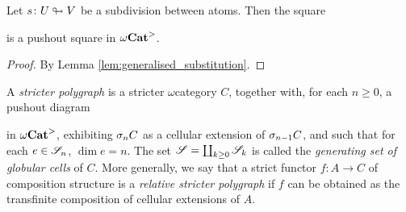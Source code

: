 \begin{cor} \label{cor:pushout_principal_cell}
    Let \( s \colon U \looparrowright V \) be a subdivision between atoms.
    Then the square
    \begin{center}
    \end{center}
    is a pushout square in \( {\omega\mathbf{Cat}}^> \).
\end{cor}
\begin{proof}
    By Lemma \ref{lem:generalised_substitution}.
\end{proof}

\begin{dfn}  \label{dfn:stricter_polygraph}
    A \emph{stricter polygraph} is a stricter \( \omega \)\nbd category \( C \), together with, for each \( n \geq 0 \), a pushout diagram
    \begin{center}
    \end{center}
    in \( {\omega\mathbf{Cat}}^> \), exhibiting \( \sigma_{n}C \) as a cellular extension of \( \sigma_{n - 1}C \), and such that for each \( e \in \mathscr{S}_n \), \( \dim e = n \).
    The set \( \mathscr{S} = \coprod_{k \geq 0} \mathscr{S}_k \) is called the \emph{generating set of globular cells} of \( C \).
    More generally, we say that a strict functor \( f \colon A \to C \) of composition structure is a \emph{relative stricter polygraph} if \( f \) can be obtained as the transfinite composition of cellular extensions of \( A \).
\end{dfn}

